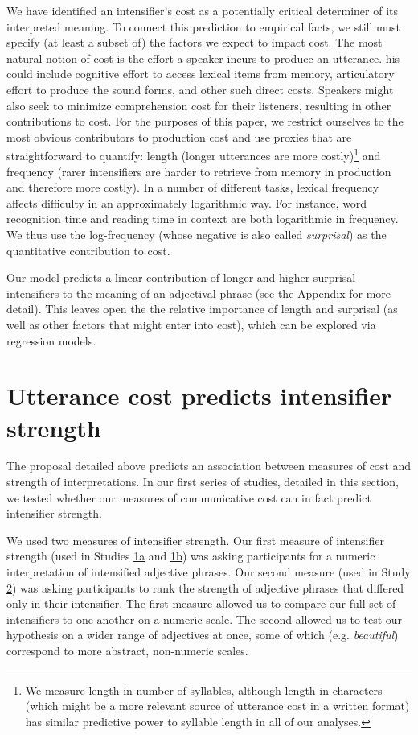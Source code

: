 \documentclass[10pt,letterpaper]{article}
\newcommand{\w}[1]{\emph{#1}}
\begin{document}
We have identified an intensifier's cost as a potentially critical determiner of its interpreted meaning.
To connect this prediction to empirical facts, we still must specify (at least a subset of) the factors we expect to impact cost.
The most natural notion of cost is the effort a speaker incurs to produce an utterance. 
his could include cognitive effort to access lexical items from memory, articulatory effort to produce  the sound forms, and other such direct costs.
Speakers might also seek to minimize comprehension cost for their listeners, resulting in other contributions to cost. 
For the purposes of this paper, we restrict ourselves to the most obvious contributors to production cost and use proxies that are straightforward to quantify: length (longer utterances are more costly)\footnote{
  We measure length in number of syllables, although length in characters (which might be a more relevant source of utterance cost in a written format) has similar predictive power to syllable length in all of our analyses.
}
and frequency (rarer intensifiers are harder to retrieve from memory in production and therefore more costly).
In a number of different tasks, lexical frequency affects difficulty in an approximately logarithmic way.
For instance, word recognition time \cite{mccusker_determinants_1977} and reading time in context \cite{smith_effect_2013} are both logarithmic in frequency.
We thus use the log-frequency (whose negative is also called \emph{surprisal}) as the quantitative contribution to cost.

Our model predicts a linear contribution of longer and higher surprisal intensifiers to the meaning of an adjectival phrase (see the \hyperref[app:model]{Appendix} for more detail). 
This leaves open the the relative importance of length and surprisal (as well as other factors that might enter into cost), which can be explored via regression models.

\section{Utterance cost predicts intensifier strength}

The proposal detailed above predicts an association between measures of cost and strength of interpretations.
In our first series of studies, detailed in this section, we tested whether our measures of communicative cost can in fact predict intensifier strength.

We used two measures of intensifier strength.
Our first measure of intensifier strength (used in Studies \hyperref[sec:study1a]{1a} and \hyperref[sec:study1b]{1b}) was asking participants for a numeric interpretation of intensified adjective phrases.
Our second measure (used in Study \hyperref[sec:study2]{2}) was asking participants to rank the strength of adjective phrases that differed only in their intensifier.
The first measure allowed us to compare our full set of intensifiers to one another on a numeric scale.
The second allowed us to test our hypothesis on a wider range of adjectives at once, some of which (e.g. \w{beautiful}) correspond to more abstract, non-numeric scales.
\end{document}
